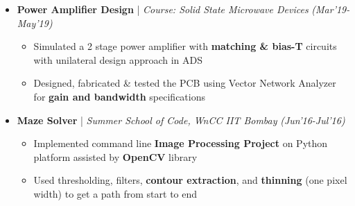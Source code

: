 \documentclass[a4paper, 10pt]{article}
\newcommand{\isep}{-2 pt}
\begin{document}
\begin{itemize}
\item \textbf{\large Power Amplifier Design} |  \textit{Course: Solid State Microwave Devices} \hfill \emph{(Mar'19-May'19)} \\
    \vspace{2pt}
	\begin{itemize}\itemsep \isep
	\vspace{-0.70cm}
		\item Simulated a 2 stage power amplifier with \textbf{matching \& bias-T} circuits with unilateral design approach in ADS 
	\item Designed, fabricated \& tested the PCB using Vector Network Analyzer for \textbf{gain and bandwidth} specifications
	\end{itemize}

\vspace{-0.18cm}

\item \textbf{\large Maze Solver} | \textit{ Summer School of Code, WnCC IIT Bombay} \hfill \emph{(Jun'16-Jul'16)} \\
    \vspace{2pt}
	\begin{itemize}\itemsep \isep
	
	\vspace{-0.70cm}
		\item Implemented command line \textbf{Image Processing Project} on Python platform assisted by \textbf{OpenCV} library
\item Used thresholding, filters, \textbf{contour extraction}, and \textbf{thinning} (one pixel width) to get a path from start to end
	\end{itemize}


\end{itemize}
\end{document}
